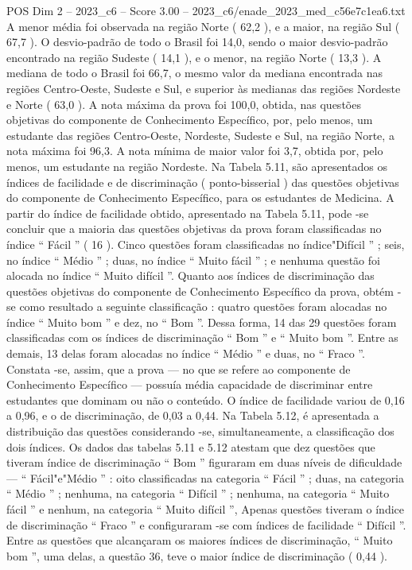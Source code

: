 \begin{textsample}{POS Dim 2 – 2023\_c6 – Score 3.00 – 2023\_c6/enade\_2023\_med\_c56e7c1ea6.txt}
A menor média foi observada na região Norte ( 62,2 ), e a maior, na região Sul ( 67,7 ).
O desvio-padrão de todo o Brasil foi 14,0, sendo o maior desvio-padrão encontrado na região Sudeste ( 14,1 ), e o menor, na região Norte ( 13,3 ).
A mediana de todo o Brasil foi 66,7, o mesmo valor da mediana encontrada nas regiões Centro-Oeste, Sudeste e Sul, e superior às medianas das regiões Nordeste e Norte ( 63,0 ).
A nota máxima da prova foi 100,0, obtida, nas questões objetivas do componente de Conhecimento Específico, por, pelo menos, um estudante das regiões Centro-Oeste, Nordeste, Sudeste e Sul, na região Norte, a nota máxima foi 96,3.
A nota mínima de maior valor foi 3,7, obtida por, pelo menos, um estudante na região Nordeste.
Na Tabela 5.11, são apresentados os índices de facilidade e de discriminação ( ponto-bisserial ) das questões objetivas do componente de Conhecimento Específico, para os estudantes de Medicina.
A partir do índice de facilidade obtido, apresentado na Tabela 5.11, pode -se concluir que a maioria das questões objetivas da prova foram classificadas no índice “ Fácil ” ( 16 ).
Cinco questões foram classificadas no índice"Difícil ” ; seis, no índice “ Médio ” ; duas, no índice “ Muito fácil ” ; e nenhuma questão foi alocada no índice “ Muito difícil ”.
Quanto aos índices de discriminação das questões objetivas do componente de Conhecimento Específico da prova, obtém -se como resultado a seguinte classificação : quatro questões foram alocadas no índice “ Muito bom ” e dez, no “ Bom ”.
Dessa forma, 14 das 29 questões foram classificadas com os índices de discriminação “ Bom ” e “ Muito bom ”.
Entre as demais, 13 delas foram alocadas no índice “ Médio ” e duas, no “ Fraco ”.
Constata -se, assim, que a prova — no que se refere ao componente de Conhecimento Específico — possuía média capacidade de discriminar entre estudantes que dominam ou não o conteúdo.
O índice de facilidade variou de 0,16 a 0,96, e o de discriminação, de 0,03 a 0,44.
Na Tabela 5.12, é apresentada a distribuição das questões considerando -se, simultaneamente, a classificação dos dois índices.
Os dados das tabelas 5.11 e 5.12 atestam que dez questões que tiveram índice de discriminação “ Bom ” figuraram em duas níveis de dificuldade — “ Fácil"e"Médio ” : oito classificadas na categoria “ Fácil ” ; duas, na categoria “ Médio ” ; nenhuma, na categoria “ Difícil ” ; nenhuma, na categoria “ Muito fácil ” e nenhum, na categoria “ Muito difícil ”, Apenas questões tiveram o índice de discriminação “ Fraco ” e configuraram -se com índices de facilidade “ Difícil ”.
Entre as questões que alcançaram os maiores índices de discriminação, “ Muito bom ”, uma delas, a questão 36, teve o maior índice de discriminação ( 0,44 ).

\end{textsample}
